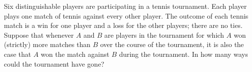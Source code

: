 Six distinguishable players are participating in a tennis tournament. Each player plays one match of tennis against every other player. The outcome of each tennis match is a win for one player and a loss for the other players; there are no ties. Suppose that whenever $A$ and $B$ are players in the tournament for which $A$ won (strictly) more matches than $B$ over the course of the tournament, it is also the case that $A$ won the match against $B$ during the tournament. In how many ways could the tournament have gone?